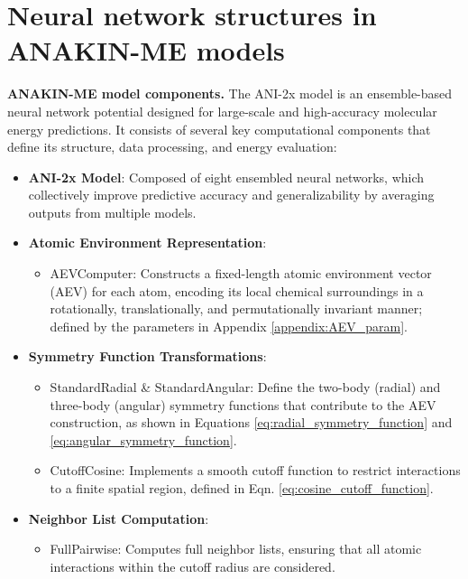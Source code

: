 \chapter{Neural network structures in ANAKIN-ME models}
\label{appendix:NN_arch}
{\bf ANAKIN-ME model components.} The ANI-2x model is an ensemble-based neural network potential designed for large-scale and high-accuracy molecular energy predictions. It consists of several key computational components that define its structure, data processing, and energy evaluation:

\begin{itemize}
    \item \textbf{ANI-2x Model}: Composed of eight ensembled neural networks, which collectively improve predictive accuracy and generalizability by averaging outputs from multiple models.

    \item \textbf{Atomic Environment Representation}:
    \begin{itemize}
        \item AEVComputer: Constructs a fixed-length atomic environment vector (AEV) for each atom, encoding its local chemical surroundings in a rotationally, translationally, and permutationally invariant manner; defined by the parameters in Appendix \ref{appendix:AEV_param}.
    \end{itemize}

    \item \textbf{Symmetry Function Transformations}:
    \begin{itemize}
        \item StandardRadial \& StandardAngular: Define the two-body (radial) and three-body (angular) symmetry functions that contribute to the AEV construction, as shown in Equations \ref{eq:radial_symmetry_function} and \ref{eq:angular_symmetry_function}.
        \item CutoffCosine: Implements a smooth cutoff function to restrict interactions to a finite spatial region, defined in Eqn. \ref{eq:cosine_cutoff_function}.
    \end{itemize}

    \item \textbf{Neighbor List Computation}:
    \begin{itemize}
        \item FullPairwise: Computes full neighbor lists, ensuring that all atomic interactions within the cutoff radius are considered.
    \end{itemize}


\end{itemize}

